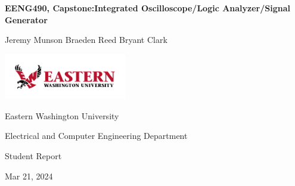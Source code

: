 	\thispagestyle{empty}
	\begin{center}
		\vspace*{1cm}
		\Huge
		\textbf{EENG490, Capstone:\linebreak \linebreak Integrated Oscilloscope/Logic Analyzer/Signal Generator}
		\vspace{0.5cm}
		\LARGE
		\vspace{1.5cm}

		Jeremy Munson\quad
		Braeden Reed\quad
		Bryant Clark\quad

		\vfill

		\includegraphics[width=0.4\textwidth]{EWULogo.png}

		\Large

		Eastern Washington University

		Electrical and Computer Engineering Department

		Student Report

		Mar 21, 2024

	\end{center}
	\newpage
